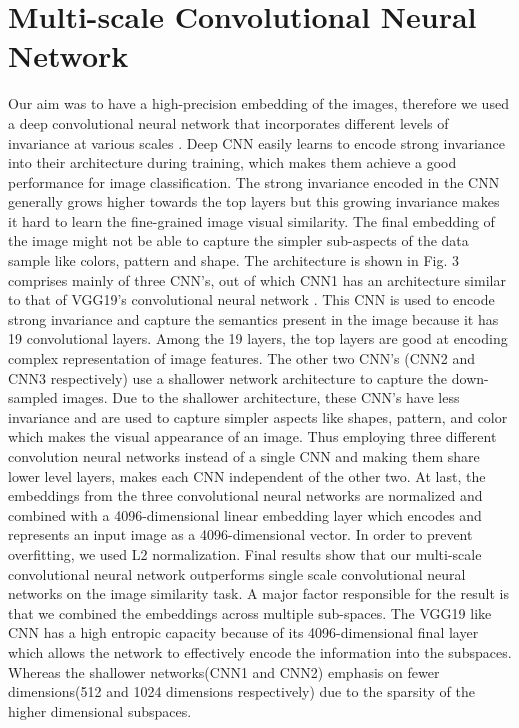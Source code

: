 \documentclass[10pt,twocolumn,letterpaper]{article}
\begin{document}
\vspace{-2mm}
\section{Multi-scale Convolutional Neural Network}\vspace{-1mm}

Our aim was to have a high-precision embedding of the images, therefore we used a deep convolutional neural network that incorporates different levels of invariance at various scales \cite{c26,c27}. Deep CNN easily learns to encode strong invariance into their architecture during training, which makes them achieve a good performance for image classification. The strong invariance encoded in the CNN generally grows higher towards the top layers but this growing invariance makes it hard to learn the fine-grained image visual similarity. The final embedding of the image might not be able to capture the simpler sub-aspects of the data sample like colors, pattern and shape. The architecture is shown in Fig. 3 comprises mainly of three CNN's, out of which CNN1 has an architecture similar to that of VGG19's convolutional neural network \cite{c4}. This CNN is used to encode strong invariance and capture the semantics present in the image because it has 19 convolutional layers. Among the 19 layers, the top layers are good at encoding complex representation of image features. The other two CNN's (CNN2 and CNN3 respectively) use a shallower network architecture to capture the down-sampled images. Due to the shallower architecture, these CNN's have less invariance and are used to capture simpler aspects like shapes, pattern, and color which makes the visual appearance of an image. Thus employing three different convolution neural networks instead of a single CNN and making them share lower level layers, makes each CNN independent of the other two. At last, the embeddings from the three convolutional neural networks are normalized and combined with a 4096-dimensional linear embedding layer which encodes and represents an input image as a 4096-dimensional vector. In order to prevent overfitting, we used L2 normalization. Final results show that our multi-scale convolutional neural network outperforms single scale convolutional neural networks on the image similarity task. A major factor responsible for the result is that we combined the embeddings across multiple sub-spaces. The VGG19 \cite{c4} like CNN has a high entropic capacity because of its 4096-dimensional final layer which allows the network to effectively encode the information into the subspaces. Whereas the shallower networks(CNN1 and CNN2) emphasis on fewer dimensions(512 and 1024 dimensions respectively) due to the sparsity of the higher dimensional subspaces.
\end{document}
